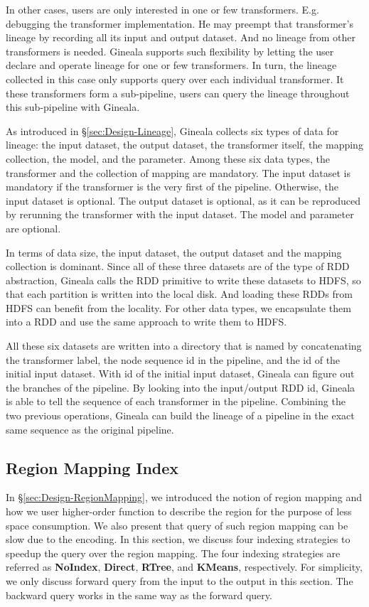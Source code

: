 \documentclass{sig-alternate}
\begin{document}
In other cases, users are only interested in one or few transformers. E.g. debugging the transformer implementation.
He may preempt that transformer's lineage by recording all its input and output dataset. 
And no lineage from other transformers is needed.
Gineala supports such flexibility by letting the user declare and operate lineage for one or few transformers.
In turn, the lineage collected in this case only supports query over each individual transformer.
It these transformers form a sub-pipeline, users can query the lineage throughout this sub-pipeline with Gineala.

As introduced in \S\ref{sec:Design-Lineage}, Gineala collects six types of data for lineage: the input dataset, the output dataset,
the transformer itself, the mapping collection, the model, and the parameter.
Among these six data types, the transformer and the collection of mapping are mandatory. 
The input dataset is mandatory if the transformer is the very first of the pipeline. 
Otherwise, the input dataset is optional.
The output dataset is optional, as it can be reproduced by rerunning the transformer with the input dataset.
The model and parameter are optional.

In terms of data size, the input dataset, the output dataset and the mapping collection is dominant. 
Since all of these three datasets are of the type of RDD abstraction, Gineala calls the RDD primitive to write these datasets
to HDFS, so that each partition is written into the local disk. 
And loading these RDDs from HDFS can benefit from the locality.
For other data types, we encapsulate them into a RDD and use the same approach to write them to HDFS.

All these six datasets are written into a directory that is named by concatenating the transformer label, 
the node sequence id in the pipeline, and the id of the initial input dataset. 
With id of the initial input dataset, Gineala can figure out the branches of the pipeline.
By looking into the input/output RDD id, Gineala is able to tell the sequence of each transformer in the pipeline.
Combining the two previous operations, Gineala can build the lineage of a pipeline in the exact same sequence
as the original pipeline.

\subsection{Region Mapping Index}
\label{sec:RegionIndex}
In \S\ref{sec:Design-RegionMapping}, we introduced the notion of region mapping and how we user higher-order function
to describe the region for the purpose of less space consumption. We also present that query of such region mapping
can be slow due to the encoding. 
In this section, we discuss four indexing strategies to speedup the query over the region mapping. 
The four indexing strategies are referred as {\bf NoIndex}, {\bf Direct}, {\bf RTree}, and {\bf KMeans}, respectively.
For simplicity, we only discuss forward query from the input to the output in this section.
The backward query works in the same way as the forward query.
\end{document}
